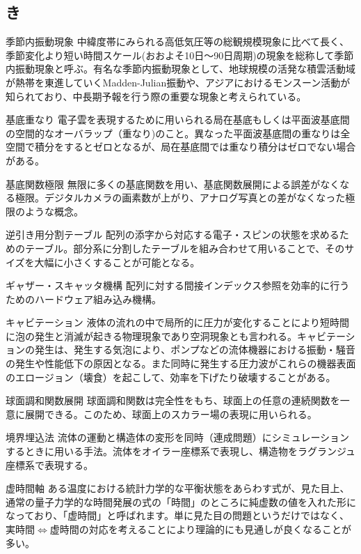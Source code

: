 \begin{用語集}
\section{き}
\item{季節内振動現象}{}
{中緯度帯にみられる高低気圧等の総観規模現象に比べて長く、季節変化より短い時間スケール(おおよそ10日～90日周期)の現象を総称して季節内振動現象と呼ぶ。有名な季節内振動現象として、地球規模の活発な積雲活動域が熱帯を東進していくMadden-Julian振動や、アジアにおけるモンスーン活動が知られており、中長期予報を行う際の重要な現象と考えられている。}
\item{基底重なり}{}
{電子雲を表現するために用いられる局在基底もしくは平面波基底間の空間的なオーバラップ（重なり)のこと。異なった平面波基底間の重なりは全空間で積分をするとゼロとなるが、局在基底間では重なり積分はゼロでない場合がある。}
\item{基底関数極限}{}
{無限に多くの基底関数を用い、基底関数展開による誤差がなくなる極限。デジタルカメラの画素数が上がり、アナログ写真との差がなくなった極限のような概念。}
\item{逆引き用分割テーブル}{}
{配列の添字から対応する電子・スピンの状態を求めるためのテーブル。部分系に分割したテーブルを組み合わせて用いることで、そのサイズを大幅に小さくすることが可能となる。}
\item{ギャザー・スキャッタ機構}{}
{配列に対する間接インデックス参照を効率的に行うためのハードウェア組み込み機構。}
\item{キャビテーション}{}
{液体の流れの中で局所的に圧力が変化することにより短時間に泡の発生と消滅が起きる物理現象であり空洞現象とも言われる。キャビテーションの発生は、発生する気泡により、ポンプなどの流体機器における振動・騒音の発生や性能低下の原因となる。また同時に発生する圧力波がこれらの機器表面のエロージョン（壊食）を起こして、効率を下げたり破壊することがある。}
\item{球面調和関数展開}{}
{球面調和関数は完全性をもち、球面上の任意の連続関数を一意に展開できる。このため、球面上のスカラー場の表現に用いられる。}
\item{境界埋込法}{}
{流体の運動と構造体の変形を同時（連成問題）にシミュレーションするときに用いる手法。流体をオイラー座標系で表現し、構造物をラグランジュ座標系で表現する。}
\item{虚時間軸}{}
{ある温度における統計力学的な平衡状態をあらわす式が、見た目上、通常の量子力学的な時間発展の式の「時間」のところに純虚数の値を入れた形になっており、「虚時間」と呼ばれます。単に見た目の問題というだけではなく、実時間$\Leftrightarrow$虚時間の対応を考えることにより理論的にも見通しが良くなることが多い。}

\end{用語集}
